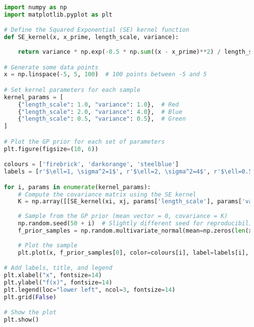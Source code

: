 \documentclass[12pt,a4paper]{article}
\begin{document}
\vspace{10pt}
\begin{lstlisting}[language=python, caption={Code of the Creation of Figure \ref{fig:SE samples diff variance plot}}]
import numpy as np
import matplotlib.pyplot as plt

# Define the Squared Exponential (SE) kernel function
def SE_kernel(x, x_prime, length_scale, variance):
    
    return variance * np.exp(-0.5 * np.sum((x - x_prime)**2) / length_scale**2)

# Generate some data points
x = np.linspace(-5, 5, 100)  # 100 points between -5 and 5

# Set kernel parameters for each sample
kernel_params = [
    {"length_scale": 1.0, "variance": 1.0},  # Red
    {"length_scale": 2.0, "variance": 4.0},  # Blue
    {"length_scale": 0.5, "variance": 0.5},  # Green   
]

# Plot the GP prior for each set of parameters
plt.figure(figsize=(10, 6))

colours = ['firebrick', 'darkorange', 'steelblue']
labels = [r'$\ell=1, \sigma^2=1$', r'$\ell=2, \sigma^2=4$', r'$\ell=0.5, \sigma^2=0.5$']

for i, params in enumerate(kernel_params):
    # Compute the covariance matrix using the SE kernel
    K = np.array([[SE_kernel(xi, xj, params['length_scale'], params['variance']) for xj in x] for xi in x])
    
    # Sample from the GP prior (mean vector = 0, covariance = K)
    np.random.seed(50 + i)  # Slightly different seed for reproducibility
    f_prior_samples = np.random.multivariate_normal(mean=np.zeros(len(x)), cov=K, size=1)
    
    # Plot the sample
    plt.plot(x, f_prior_samples[0], color=colours[i], label=labels[i], linewidth=3)

# Add labels, title, and legend
plt.xlabel("x", fontsize=14)
plt.ylabel("f(x)", fontsize=14)
plt.legend(loc="lower left", ncol=3, fontsize=14)
plt.grid(False)

# Show the plot
plt.show()
\end{lstlisting}
\end{document}
